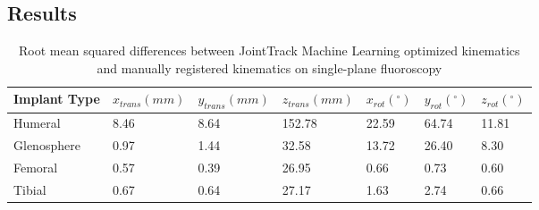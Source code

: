 \subsection{Results}
\begin{table}[h!]
	\caption{Root mean squared differences between JointTrack Machine Learning optimized kinematics and manually registered kinematics on single-plane fluoroscopy} \label{tab:jtml-tsa-tka-vals}
	\begin{tabularx}{\linewidth}{V{10cm}XXXXXX}\hline
		 Implant Type & $x_{trans} (mm)$ & $y_{trans} (mm)$ & $z_{trans} (mm)$ & $x_{rot} (^{\circ})$ & $y_{rot} (^{\circ})$ & $z_{rot} (^{\circ})$ \\ \hline
		Humeral            & 8.46             & 8.64             & 152.78           & 22.59                & 64.74                & 11.81                \\
		Glenosphere        & 0.97             & 1.44             & 32.58            & 13.72                & 26.40                & 8.30                 \\
		Femoral            & 0.57             & 0.39             & 26.95            & 0.66                 & 0.73                 & 0.60                 \\
		Tibial             & 0.67             & 0.64             & 27.17            & 1.63                 & 2.74                 & 0.66                 \\\hline
	\end{tabularx}
\end{table}


